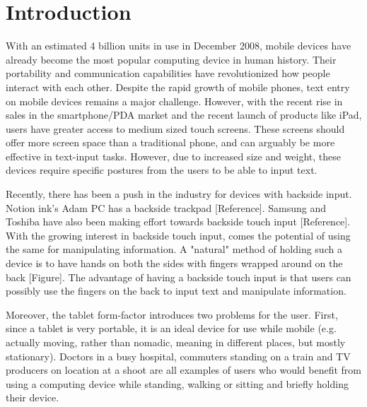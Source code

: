 \section{Introduction}

With an estimated 4 billion units in use in December 2008, mobile
devices have already become the most popular computing device in human
history. Their portability and communication capabilities have
revolutionized how people interact with each other. Despite the rapid
growth of mobile phones, text entry on mobile devices remains a major
challenge. However, with the recent rise in sales in the
smartphone/PDA market and the recent launch of products like iPad,
users have greater access to medium sized touch screens. These screens
should offer more screen space than a traditional phone, and can
arguably be more effective in text-input tasks. However, due to
increased size and weight, these devices require specific postures
from the users to be able to input text.

Recently, there has been a push in the industry for devices with
backside input. Notion ink's Adam PC has a backside trackpad
[Reference]. Samsung and Toshiba have also been making effort towards
backside touch input [Reference]. With the growing interest in
backside touch input, comes the potential of using the same for
manipulating information. A "natural" method of holding such a device
is to have hands on both the sides with fingers wrapped around on the
back [Figure]. The advantage of having a backside touch input is that
users can possibly use the fingers on the back to input text and
manipulate information.

Moreover, the tablet form-factor introduces two problems for the user.
First, since a tablet is very portable, it is an ideal device for use
while mobile (e.g. actually moving, rather than nomadic, meaning in
different places, but mostly stationary).  Doctors in a busy hospital,
commuters standing on a train and TV producers on location at a shoot
are all examples of users who would benefit from using a computing
device while standing, walking or sitting and briefly holding their
device.

